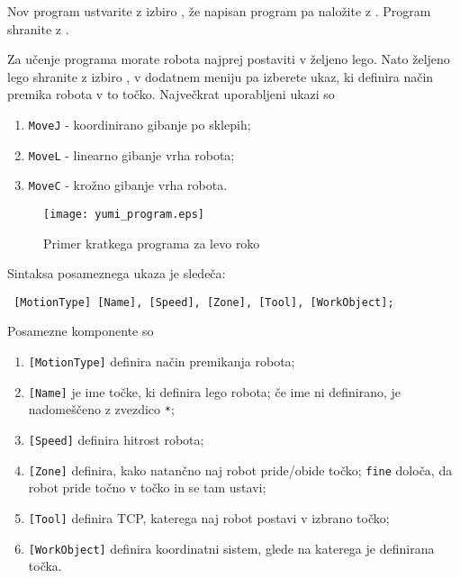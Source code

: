 Nov program ustvarite z izbiro , že napisan program pa naložite z . Program shranite z .


Za učenje programa morate robota najprej postaviti v željeno lego. Nato željeno lego shranite z izbiro , v dodatnem meniju pa izberete ukaz, ki definira način premika robota v to točko. Največkrat uporabljeni ukazi so
\begin{enumerate}
  \item \verb"MoveJ" - koordinirano gibanje po sklepih;
  \item \verb"MoveL" - linearno gibanje vrha robota;
  \item \verb"MoveC" - krožno gibanje vrha robota.
\end{enumerate}

\begin{figure}[!tbh]
\centering
\texttt{[image: yumi\_program.eps]}
\caption{Primer kratkega programa za levo roko}
\label{fig:yumi_program_L}
\end{figure}

Sintaksa posameznega ukaza je sledeča:
{\small
\begin{verbatim}
 [MotionType] [Name], [Speed], [Zone], [Tool], [WorkObject];
\end{verbatim}
}
Posamezne komponente so
\begin{enumerate}
  \item \verb"[MotionType]" definira način premikanja robota;
  \item \verb"[Name]" je ime točke, ki definira lego robota; če ime ni definirano, je nadomeščeno z zvezdico \verb"*";
  \item \verb"[Speed]" definira hitrost robota;
  \item \verb"[Zone]" definira, kako natančno naj robot pride/obide točko; \verb"fine" določa, da robot pride točno v točko in se tam ustavi;
  \item \verb"[Tool]" definira TCP, katerega naj robot postavi v izbrano točko;
  \item \verb"[WorkObject]" definira koordinatni sistem, glede na katerega je definirana točka.
\end{enumerate}

